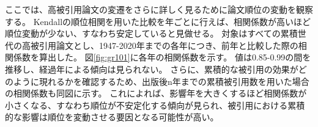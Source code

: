 ここでは、高被引用論文の変遷をさらに詳しく見るために論文順位の変動を観察する。
Kendallの順位相関を用いた比較を年ごとに行えば、相関係数が高いほど順位変動が少ない、すなわち安定していると見做せる。
対象はすべての累積世代の高被引用論文とし、1947-2020年までの各年につき、前年と比較した際の相関係数を算出した。
図\ref{fig:gr101}に各年の相関係数を示す。
値は0.85-0.99の間を推移し、経過年による傾向は見られない。
さらに、累積的な被引用の効果がどのように現れるかを確認するため、出版後n年までの累積被引用数を用いた場合の相関係数も同図に示す。
これによれば、影響年を大きくするほど相関係数が小さくなる、すなわち順位が不安定化する傾向が見られ、被引用における累積的な影響は順位を変動させる要因となる可能性が高い。
